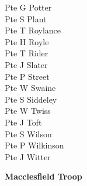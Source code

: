 \begin{multicols}{2}
  Pte G Potter \\
  Pte S Plant \\
  Pte T Roylance \\
  Pte H Royle \\
  Pte T Rider \\
  Pte J Slater \\
  Pte P Street \\
  Pte W Swaine \\
  Pte S Siddeley \\
  Pte W Twiss \\
  Pte J Toft \\
  Pte S Wilson \\
  Pte P Wilkinson \\
  Pte J Witter \\
\end{multicols}

\begin{center}
  \Large
  \textbf{Macclesfield Troop}
\end{center}

